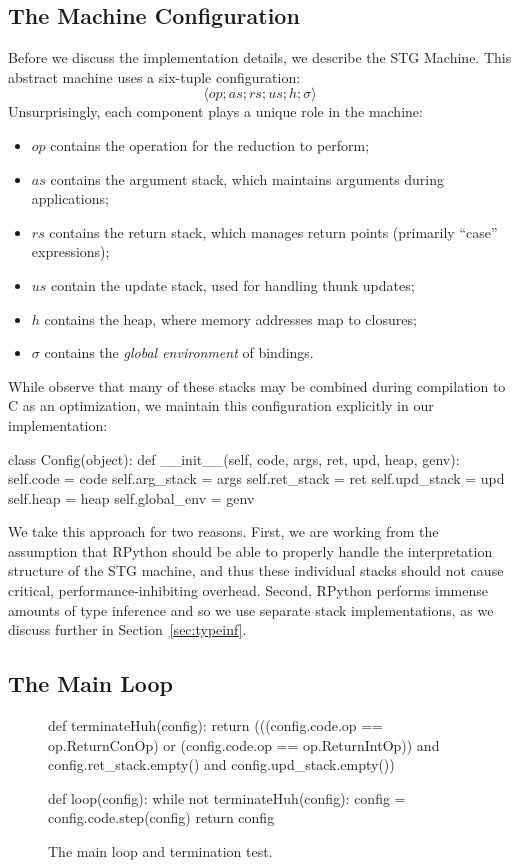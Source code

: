 \documentclass[preprint]{sigplanconf}
\begin{document}
\subsection{The Machine Configuration}

Before we discuss the implementation details, we describe the
STG Machine. This abstract machine uses a six-tuple configuration:
\[\langle op; as; rs; us; h; \sigma\rangle\]
Unsurprisingly, each component plays a unique role in the machine:
\begin{itemize}
  \item $op$ contains the operation for the reduction to perform;
  \item $as$ contains the argument stack, which maintains arguments
        during applications;
  \item $rs$ contains the return stack, which manages return points
        (primarily ``case'' expressions);
  \item $us$ contain the update stack, used for handling thunk updates;
  \item $h$ contains the heap, where memory addresses map to closures;
  \item $\sigma$ contains the \emph{global environment} of bindings.
\end{itemize}
While \citet{spj:stgmachine} observe that many of these stacks may
be combined during compilation to C as an optimization, we maintain
this configuration explicitly in our implementation:
\begin{code}
class Config(object):
  def __init__(self, code, args, ret,  
                     upd, heap, genv):
    self.code       = code
    self.arg_stack  = args
    self.ret_stack  = ret
    self.upd_stack  = upd
    self.heap       = heap
    self.global_env = genv
\end{code}
We take this approach for two reasons. First, we are working from the
assumption that RPython should be able to properly handle the interpretation
structure of the STG machine, and thus these individual stacks should not
cause critical, performance-inhibiting overhead.
Second, RPython performs immense amounts of type inference and so we use
separate stack implementations, as we discuss further in
Section~\ref{sec:typeinf}.

\subsection{The Main Loop}

\begin{figure}
\begin{code}
def terminateHuh(config):
  return 
    (((config.code.op == op.ReturnConOp) or 
      (config.code.op == op.ReturnIntOp)) 
     and config.ret_stack.empty()
     and config.upd_stack.empty())

def loop(config):
  while not terminateHuh(config):
    config = config.code.step(config)
  return config
\end{code}
\caption{\label{fig:loop}The main loop and termination test.}
\end{figure}
\end{document}
